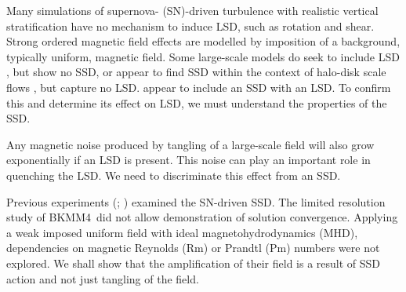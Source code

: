 \documentclass[preprint2]{aastex63}
\newcommand\BKM{{\sf BKMM4}}
\begin{document}
 Many simulations of supernova- (SN)-driven turbulence with realistic vertical
 stratification \citep[e.g.,][]{deAvillez:2005,PO07,Hill:2012a,HI14} have no
 mechanism to induce LSD, such as rotation and shear.
 Strong ordered magnetic field effects are modelled by
 imposition of a background, typically uniform, magnetic field.
 {Some large-scale models do seek to include LSD 
 \citep[e.g.,][]{Korpi:1999b,Gressel:2008,HWK09,WA09,Pakmor17,
 GE20}, but show no SSD, or appear to find SSD 
 within the context of halo-disk
 scale flows \citep[e.g.,][]{RT16,SBADMN19},  but capture no LSD.}
\citet[][with additional analysis by \citealt{EGSFB16}]{Gent:2013b}
 appear to include an {SSD with} {an} {LSD}.
 To confirm this and determine its effect on LSD, we must understand the
 properties of the SSD.
     
 Any magnetic noise produced by tangling {of a large-scale field}
 will also grow exponentially {if an LSD is} present.
 This noise {can play} an important role in quenching the LSD.
 We need to discriminate this effect from an SSD.   

 Previous experiments ({\citealp[e.g.,][hereafter \BKM]{BKMM04};
 \citealp{BalKim05,MacLow:2005}})
 examined the SN-driven SSD.
 {The limited  resolution} {study} {of \BKM\ did not allow
 demonstration of {solution} convergence.
 Applying a weak imposed uniform field with ideal magnetohydrodynamics (MHD),
 dependencies on magnetic Reynolds (Rm) or Prandtl (Pm) numbers were not
 explored.}
 We shall show that the amplification of their field is a result
 of SSD action and not just tangling of the field.
\end{document}
